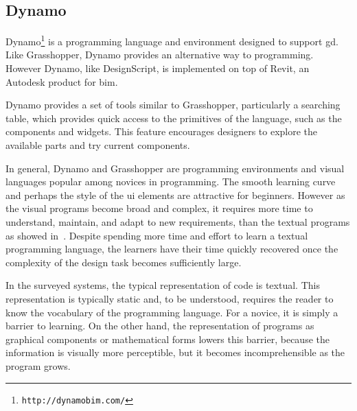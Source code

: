 \subsection{Dynamo}
\label{subsed:dynamo}
Dynamo\footnote{\texttt{http://dynamobim.com/}} is a programming language and environment designed to support \gls{gd}. Like Grasshopper, Dynamo provides an alternative way to programming. However Dynamo, like DesignScript, is implemented on top of Revit, an Autodesk product for \gls{bim}.

Dynamo provides a set of tools similar to Grasshopper, particularly a searching table, which provides quick access to the primitives of the language, such as the components and widgets. This feature encourages designers to explore the available parts and try current components.

In general, Dynamo and Grasshopper are programming environments and visual languages popular among novices in programming. The smooth learning curve and perhaps the style of the \gls{ui} elements are attractive for beginners. However as the visual programs become broad and complex, it requires more time to understand, maintain, and adapt to new requirements, than the textual programs as showed in~\cite{leitao2011programming}. Despite spending more time and effort to learn a textual programming language, the learners have their time quickly recovered once the complexity of the design task becomes sufficiently large.

In the surveyed systems, the typical representation of code is textual. This representation is typically static and, to be understood, requires the reader to know the vocabulary of the programming language. For a novice, it is simply a barrier to learning. On the other hand, the representation of programs as graphical components or mathematical forms lowers this barrier, because the information is visually more perceptible, but it becomes incomprehensible as the program grows.